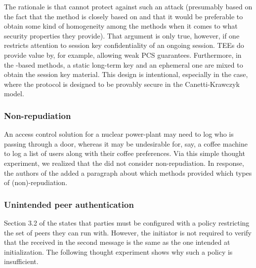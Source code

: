 \documentclass[runningheads, envcountsame, a4paper, draft, x11names]{llncs}
\newcommand{\spacehack}{\vspace{-1em}}
\begin{document}
The rationale is that \mSigma{} cannot protect against such an attack
(presumably based on the fact that the \mSigSig{} method is closely based on
\mSigmaI{} and that it would be preferable to obtain some kind of homogeneity
among the \mEdhoc{} methods when it comes to what security properties
they provide).
%
That argument is only true, however, if one restricts attention to session key
confidentiality of an ongoing session.
%
TEEs do provide value by, for example, allowing weak PCS guarantees.
%
Furthermore, in the \mStat{}-based methods, a static long-term key and an
ephemeral one are mixed to obtain the session key material.
%
This design is intentional, especially in the \mOptls{} case, where the
protocol is designed to be provably secure in the Canetti-Krawczyk model.
%
\spacehack
\subsubsection{Non-repudiation}
An access control solution for a nuclear power-plant may need to log who is
passing through a door, whereas it may be undesirable for, say, a coffee
machine to log a list of users along with their coffee preferences.
%
Via this simple thought experiment, we realized that the \mSpec{} did not
consider non-repudiation.
%
In response, the authors of the \mSpec{} added a paragraph about which methods
provided which types of (non)-repudiation.

\spacehack
\subsubsection{Unintended peer authentication}
Section 3.2 of the \mSpec{} states that parties must be configured
with a policy restricting the set of peers they can run \mEdhoc{} with.
%
However, the initiator is not required to verify that the \mIdcredr{} received
in the second message is the same as the one intended at initialization.
%
The following thought experiment shows why such a policy is insufficient.
%
\end{document}

